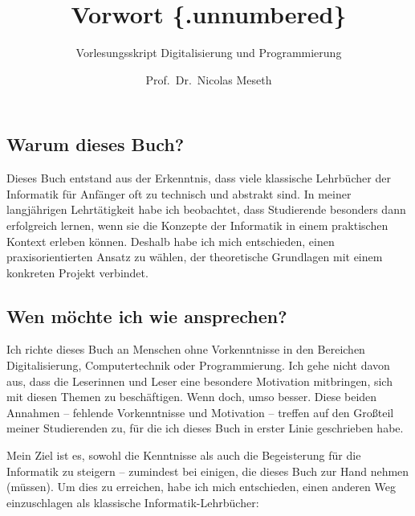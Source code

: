 \documentclass[
  letterpaper,
  DIV=11]{scrartcl}
\title{Vorwort \{.unnumbered\}}
\subtitle{Vorlesungsskript Digitalisierung und Programmierung}
\author{Prof.~Dr.~Nicolas Meseth}
\date{}
\renewcommand*\contentsname{Inhaltsverzeichnis}
\newcommand\contentsname{Inhaltsverzeichnis}
\begin{document}
\maketitle

\renewcommand*\contentsname{Inhaltsverzeichnis}
{
\hypersetup{linkcolor=}
\setcounter{tocdepth}{3}
\tableofcontents
}

\subsection{Warum dieses Buch?}\label{warum-dieses-buch}

Dieses Buch entstand aus der Erkenntnis, dass viele klassische
Lehrbücher der Informatik für Anfänger oft zu technisch und abstrakt
sind. In meiner langjährigen Lehrtätigkeit habe ich beobachtet, dass
Studierende besonders dann erfolgreich lernen, wenn sie die Konzepte der
Informatik in einem praktischen Kontext erleben können. Deshalb habe ich
mich entschieden, einen praxisorientierten Ansatz zu wählen, der
theoretische Grundlagen mit einem konkreten Projekt verbindet.

\subsection{Wen möchte ich wie
ansprechen?}\label{wen-muxf6chte-ich-wie-ansprechen}

Ich richte dieses Buch an Menschen ohne Vorkenntnisse in den Bereichen
Digitalisierung, Computertechnik oder Programmierung. Ich gehe nicht
davon aus, dass die Leserinnen und Leser eine besondere Motivation
mitbringen, sich mit diesen Themen zu beschäftigen. Wenn doch, umso
besser. Diese beiden Annahmen -- fehlende Vorkenntnisse und Motivation
-- treffen auf den Großteil meiner Studierenden zu, für die ich dieses
Buch in erster Linie geschrieben habe.

Mein Ziel ist es, sowohl die Kenntnisse als auch die Begeisterung für
die Informatik zu steigern -- zumindest bei einigen, die dieses Buch zur
Hand nehmen (müssen). Um dies zu erreichen, habe ich mich entschieden,
einen anderen Weg einzuschlagen als klassische Informatik-Lehrbücher:
\end{document}
